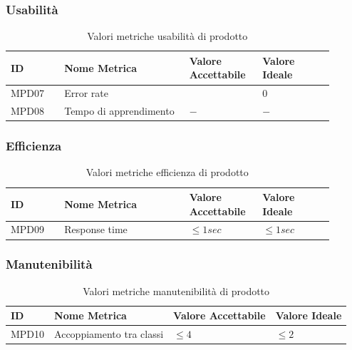 \documentclass[a4paper,12pt]{article}
\begin{document}
            \subsubsection{Usabilità}
            \begin{longtable}{|M{0.15\linewidth}|M{0.35\linewidth}|M{0.2\linewidth}|M{0.2\linewidth}|}

                \caption{Valori metriche usabilità di prodotto} \\
                \hline
                \textbf{ID} & \textbf{Nome Metrica} & \textbf{Valore Accettabile} & \textbf{Valore Ideale} \\
                \hline
                \endhead

                    MPD07 & Error rate &  & $0$ \\
                    \hline

                    MPD08 & Tempo di apprendimento & $ - $ & $ - $ \\
                    \hline

            \end{longtable}

            \subsubsection{Efficienza}
            \begin{longtable}{|M{0.15\linewidth}|M{0.35\linewidth}|M{0.2\linewidth}|M{0.2\linewidth}|}

                \caption{Valori metriche efficienza di prodotto} \\
                \hline
                \textbf{ID} & \textbf{Nome Metrica} & \textbf{Valore Accettabile} & \textbf{Valore Ideale} \\
                \hline
                \endhead

                    MPD09 & Response time & $\le 1sec $ & $\le 1sec $  \\
                    \hline

            \end{longtable}


            \subsubsection{Manutenibilità}
            \begin{longtable}{|M{1.5cm}|M{5cm}|M{2.5cm}|M{2.5cm}|}

                \caption{Valori metriche manutenibilità di prodotto} \\
                \hline
                \textbf{ID} & \textbf{Nome Metrica} & \textbf{Valore Accettabile} & \textbf{Valore Ideale} \\
                \hline
                \endhead

                    MPD10 & Accoppiamento tra classi & $\le4$ & $\le2$ \\
                    \hline

            \end{longtable}
            
\end{document}

